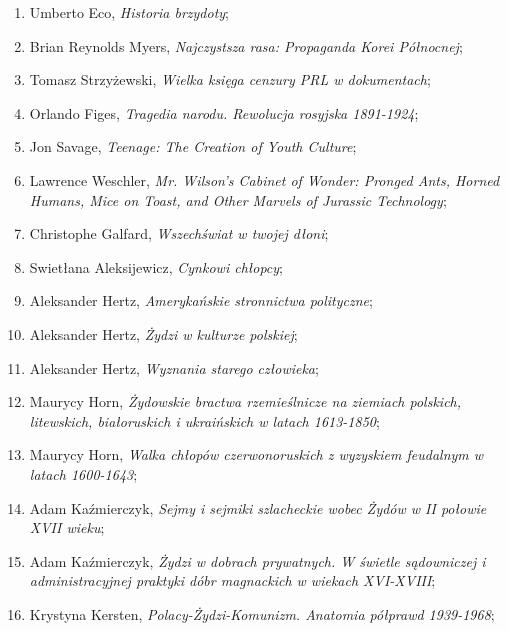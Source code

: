 \documentclass[a4paper,11pt]{article}
\begin{document}
\begin{enumerate}
\item Umberto Eco, \emph{Historia brzydoty};

\item Brian Reynolds Myers, \emph{Najczystsza rasa: Propaganda Korei
    Północnej};

\item Tomasz Strzyżewski, \emph{Wielka księga cenzury PRL w
    dokumentach};

\item Orlando Figes, \emph{Tragedia narodu. Rewolucja rosyjska
    1891-1924};

\item Jon Savage, \emph{Teenage: The Creation of Youth Culture};

\item Lawrence Weschler, \emph{Mr. Wilson's Cabinet of Wonder: Pronged
    Ants, Horned Humans, Mice on Toast, and Other Marvels of Jurassic
    Technology};

\item Christophe Galfard, \emph{Wszechświat w twojej dłoni};

\item Swietłana Aleksijewicz, \emph{Cynkowi chłopcy};

\item Aleksander Hertz, \emph{Amerykańskie stronnictwa polityczne};

\item Aleksander Hertz, \emph{Żydzi w kulturze polskiej};

\item Aleksander Hertz, \emph{Wyznania starego człowieka};

\item Maurycy Horn, \emph{Żydowskie bractwa rzemieślnicze na ziemiach
    polskich, litewskich, białoruskich i ukraińskich w latach
    1613-1850};

\item Maurycy Horn, \emph{Walka chłopów czerwonoruskich z wyzyskiem
    feudalnym w latach 1600-1643};


\item Adam Kaźmierczyk, \emph{Sejmy i sejmiki szlacheckie wobec Żydów
    w II połowie XVII wieku};

\item Adam Kaźmierczyk, \emph{Żydzi w dobrach prywatnych. W świetle
    sądowniczej i administracyjnej praktyki dóbr magnackich w wiekach
    XVI-XVIII};

\item Krystyna Kersten, \emph{Polacy-Żydzi-Komunizm. Anatomia półprawd
    1939-1968};


\end{enumerate}
\end{document}
